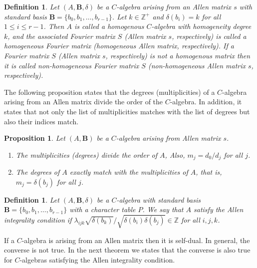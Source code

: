 \documentclass[12pt]{amsart}
\newtheorem{prop}[thm]{Proposition}
\newtheorem{definition}[thm]{Definition}
\begin{document}
\begin{definition}
Let $(A,{{\mathbf B}}, \delta)$ be a $C$-algebra arising from an Allen matrix $s$ with standard basis ${{\mathbf B}}=\{b_0,b_1,\hdots, b_{r-1}\}$. Let $k\in {{\mathbb Z}}^+$ and $\delta(b_i)=k$ for all $1\leq i\leq r-1$. Then $A$ is called a \emph{homogenous $C$-algebra} with \emph{homogeneity degree} $k$, and the associated Fourier matrix $S$ (Allen matrix $s$, respectively) is called a \emph{homogeneous Fourier matrix} (\emph{homogeneous Allen matrix}, respectively). If a Fourier matrix $S$ (Allen matrix $s$, respectively) is not a homogenous matrix then it is called  \emph{non-homogeneous Fourier matrix $S$} (\emph{non-homogeneous Allen matrix $s$}, respectively).
\end{definition}

The following proposition states that the degrees (multiplicities) of a $C$-algebra  arising from an Allen matrix divide the order of the $C$-algebra. In addition, it states that not only the list of multiplicities matches with the list of degrees but also their indices match.

\begin{prop}\label{SymmetrizingPropertyProp}
Let $(A,\mathbf{B})$ be a $C$-algebra arising from Allen matrix $s$.
\begin{enumerate}
 \item  The multiplicities (degrees) divide the order of $A$, Also, $m_j= d_0/d_j$ for all $j$.

  \item The degrees of $A$ exactly match with the multiplicities of $A$, that is, $m_j=\delta(b_j)$ for all $j$.
\end{enumerate}
\end{prop}

\begin{definition}\label{AllenIntDef} Let $(A,{{\mathbf B}}, \delta)$ be a $C$-algebra with standard basis ${{\mathbf B}}=\{b_0,b_1,\hdots, b_{r-1}\}$ with a character table $P$. We say that $A$  satisfy the \emph{Allen integrality condition} if ${\lambda_{ijk}\sqrt{\delta(b_k)}}/{\sqrt{\delta(b_i)\delta(b_j)}}\in {{\mathbb Z}}$ for all $i,j,k$.
\end{definition}

If a $C$-algebra is arising from an Allen matrix then it is self-dual. In general, the converse is not true. In the next theorem we states that the converse is also true for $C$-algebras satisfying the Allen integrality condition.
\end{document}
